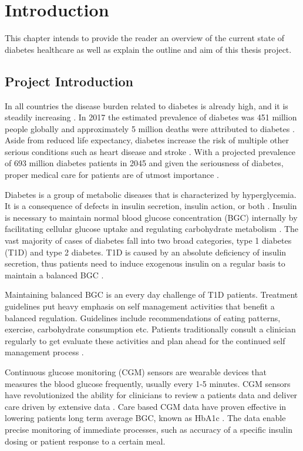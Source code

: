 \chapter{Introduction}

This chapter intends to provide the reader an overview of the current state of diabetes healthcare as well as explain the outline and aim of this thesis project.

\section{Project Introduction}

In all countries the disease burden related to diabetes is already high, and it is steadily increasing \parencite{Forouhi2014}.
In 2017 the estimated prevalence of diabetes was 451 million people globally and approximately 5 million deaths were attributed to diabetes \parencite{Cho2018}.
Aside from reduced life expectancy, diabetes increase the risk of multiple other serious conditions such as heart disease and stroke \parencite{Forouhi2014}.
With a projected prevalence of 693 million diabetes patients in 2045 and given the seriousness of diabetes, proper medical care for patients are of utmost importance \parencite{Cho2018}.

Diabetes is a group of metabolic diseases that is characterized by hyperglycemia.
It is a consequence of defects in insulin secretion, insulin action, or both \parencite{ADA2010}.
Insulin is necessary to maintain normal blood glucose concentration (BGC) internally by facilitating cellular glucose uptake and regulating carbohydrate metabolism \parencite{Wilcox2005}.
The vast majority of cases of diabetes fall into two broad categories, type 1 diabetes (T1D) and type 2 diabetes.
T1D is caused by an absolute deficiency of insulin secretion, thus patients need to induce exogenous insulin on a regular basis to maintain a balanced BGC \parencite{ADA2010}.

Maintaining balanced BGC is an every day challenge of T1D patients.
Treatment guidelines put heavy emphasis on self management activities that benefit a balanced regulation.
Guidelines include recommendations of eating patterns, exercise, carbohydrate consumption etc.
Patients traditionally consult a clinician regularly to get evaluate these activities and plan ahead for the continued self management process \parencite{Cooke2013}.

Continuous glucose monitoring (CGM) sensors are wearable devices that measures the blood glucose frequently, usually every 1-5 minutes.
CGM sensors have revolutionized the ability for clinicians to review a patients data and deliver care driven by extensive data \parencite{Facchinetti2016}.
Care based CGM data have proven effective in lowering patients long term average BGC, known as HbA1c \parencite{dungan2018monitoring}.
The data enable precise monitoring of immediate processes, such as accuracy of a specific insulin dosing or patient response to a certain meal.

